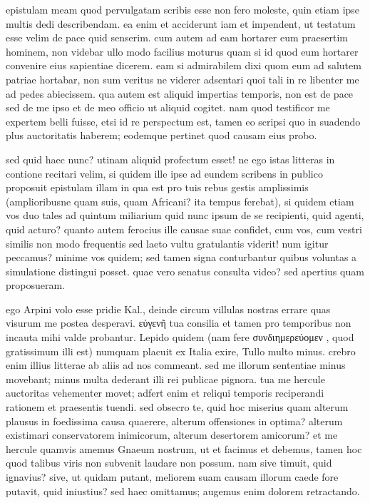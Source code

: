 


 epistulam meam quod pervulgatam scribis esse non fero moleste, quin etiam ipse multis dedi describendam. ea enim et acciderunt iam et impendent, ut testatum esse velim de pace quid senserim. cum autem ad eam hortarer eum praesertim hominem, non videbar ullo modo facilius moturus quam si id quod eum hortarer convenire eius sapientiae dicerem. eam si admirabilem dixi quom eum ad salutem patriae hortabar, non sum veritus ne viderer adsentari quoi tali in re libenter me ad pedes abiecissem. qua autem est aliquid impertias temporis, non est de pace sed de me ipso et de meo officio ut aliquid cogitet. nam quod testificor me expertem belli fuisse, etsi id re perspectum est, tamen eo scripsi quo in suadendo plus auctoritatis haberem; eodemque pertinet quod causam eius probo.

 sed quid haec nunc? utinam aliquid profectum esset! ne ego istas litteras in contione recitari velim, si quidem ille ipse ad eundem scribens in publico proposuit epistulam illam in qua est pro tuis rebus gestis amplissimis (amplioribusne quam suis, quam Africani? ita tempus ferebat), si quidem etiam vos duo tales ad quintum miliarium quid nunc ipsum de se recipienti, quid agenti, quid acturo? quanto autem ferocius ille causae suae confidet, cum vos, cum vestri similis non modo frequentis sed laeto vultu gratulantis viderit! num igitur peccamus? minime vos quidem; sed tamen signa conturbantur quibus voluntas a simulatione distingui posset. quae vero senatus consulta video? sed apertius quam proposueram.

 ego Arpini volo esse pridie Kal., deinde circum villulas nostras errare quas visurum me postea desperavi. εὐγενῆ tua consilia et tamen pro temporibus non incauta mihi valde probantur. Lepido quidem (nam fere συνδιημερεύομεν , quod gratissimum illi est) numquam placuit ex Italia exire, Tullo multo minus. crebro enim illius litterae ab aliis ad nos commeant. sed me illorum sententiae minus movebant; minus multa dederant illi rei publicae pignora. tua me hercule auctoritas vehementer movet; adfert enim et reliqui temporis reciperandi rationem et praesentis tuendi. sed obsecro te, quid hoc miserius quam alterum plausus in foedissima causa quaerere, alterum offensiones in optima? alterum existimari conservatorem inimicorum, alterum desertorem amicorum? et me hercule quamvis amemus Gnaeum nostrum, ut et facimus et debemus, tamen hoc quod talibus viris non subvenit laudare non possum. nam sive timuit, quid ignavius? sive, ut quidam putant, meliorem suam causam illorum caede fore putavit, quid iniustius? sed haec omittamus; augemus enim dolorem retractando.

